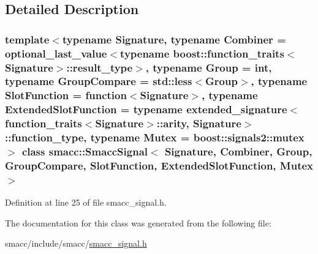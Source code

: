 \subsection{Detailed Description}
\subsubsection*{template$<$typename Signature, typename Combiner = optional\+\_\+last\+\_\+value$<$typename boost\+::function\+\_\+traits$<$\+Signature$>$\+::result\+\_\+type$>$, typename Group = int, typename Group\+Compare = std\+::less$<$\+Group$>$, typename Slot\+Function = function$<$\+Signature$>$, typename Extended\+Slot\+Function = typename extended\+\_\+signature$<$function\+\_\+traits$<$\+Signature$>$\+::arity, Signature$>$\+::function\+\_\+type, typename Mutex = boost\+::signals2\+::mutex$>$\newline
class smacc\+::\+Smacc\+Signal$<$ Signature, Combiner, Group, Group\+Compare, Slot\+Function, Extended\+Slot\+Function, Mutex $>$}



Definition at line 25 of file smacc\+\_\+signal.\+h.



The documentation for this class was generated from the following file\+:\begin{DoxyCompactItemize}
\item 
smacc/include/smacc/\hyperlink{smacc__signal_8h}{smacc\+\_\+signal.\+h}\end{DoxyCompactItemize}
